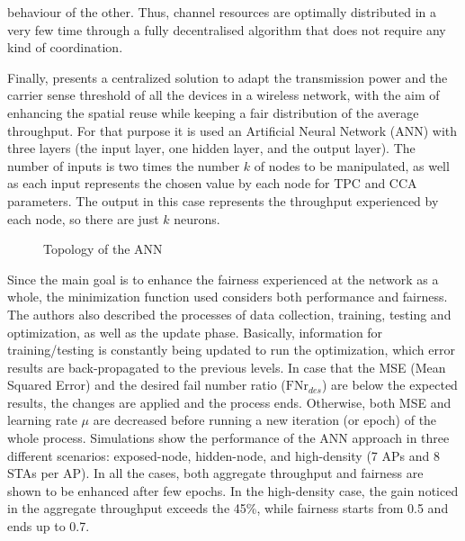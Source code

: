 \documentclass[12pt, a4paper,twoside]{tesi_upf}
\begin{document}
behaviour of the other. Thus, channel resources are optimally distributed in a very few time through a fully decentralised algorithm that does not require any kind of coordination.
			
				Finally, \cite{jamil2016novel} presents a centralized solution to adapt the transmission power and the carrier sense threshold of all the devices in a wireless network, with the aim of enhancing the spatial reuse while keeping a fair distribution of the average throughput. For that purpose it is used an Artificial Neural Network (ANN) with three layers (the input layer, one hidden layer, and the output layer). The number of inputs is two times the number $k$ of nodes to be manipulated, as well as each input represents the chosen value by each node for TPC and CCA parameters. The output in this case represents the throughput experienced by each node, so there are just $k$ neurons. 	
				\begin{figure}[h!]
					\centering
					\caption{Topology of the ANN}
					\label{fig:neural_network_topology}
				\end{figure}	
				Since the main goal is to enhance the fairness experienced at the network as a whole, the minimization function used considers both performance and fairness. The authors also described the processes of data collection, training, testing and optimization, as well as the update phase. Basically, information for training/testing is constantly being updated to run the optimization, which error results are back-propagated to the previous levels. In case that the MSE (Mean Squared Error) and the desired fail number ratio ($\text{FNr}_{des}$) are below the expected results, the changes are applied and the process ends. Otherwise, both MSE and learning rate $\mu$ are decreased before running a new iteration (or epoch) of the whole process. Simulations show the performance of the ANN approach in three different scenarios: exposed-node,  hidden-node, and high-density (7 APs and 8 STAs per AP). In all the cases, both aggregate throughput and fairness are shown to be enhanced after few epochs. In the high-density case, the gain noticed in the aggregate throughput exceeds the 45\%, while fairness starts from 0.5 and ends up to 0.7.
\end{document}
